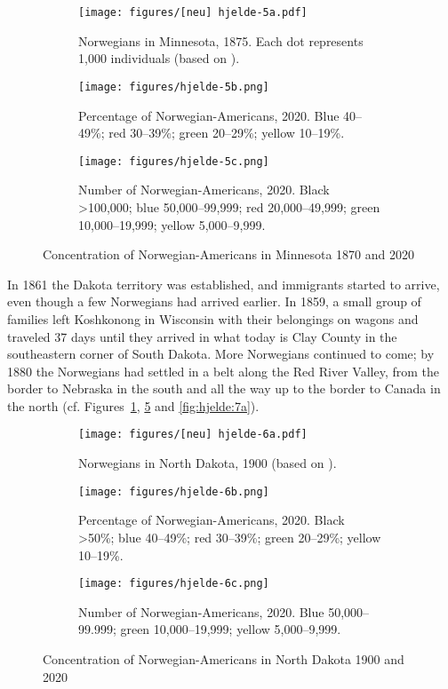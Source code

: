\documentclass[output=paper]{langscibook}
\begin{document}
\begin{figure}
\begin{subfigure}[t]{.3\textwidth}
\texttt{[image: figures/[neu] hjelde-5a.pdf]} 
\caption{Norwegians in Minnesota, 1875. Each dot represents 1,000 individuals (based on \citealt{Qualey1938}).} \label{fig:hjelde:5a}
\end{subfigure}\hfill
\begin{subfigure}[t]{.3\textwidth}
\texttt{[image: figures/hjelde-5b.png]} 
\caption{Percentage of Norwegian\hyp Americans, 2020. Blue 40--49\%; red 30--39\%; green 20--29\%; yellow 10--19\%.}\label{fig:hjelde:5b}
\end{subfigure}\hfill
\begin{subfigure}[t]{.3\textwidth}
\texttt{[image: figures/hjelde-5c.png]} 
\caption{Number of Norwegian\hyp Americans, 2020. Black >100,000; blue 50,000--99,999; red 20,000--49,999; green 10,000--19,999; yellow 5,000--9,999.}\label{fig:hjelde:5c}
\end{subfigure}%
\caption{Concentration of Norwegian-Americans in Minnesota 1870 and 2020}
\end{figure}

In 1861 the Dakota territory was established, and immigrants started to arrive, even though a few Norwegians had arrived earlier. In 1859, a small group of families left Koshkonong in Wisconsin with their belongings on wagons and traveled 37 days until they arrived in what today is Clay County in the southeastern corner of South Dakota. More Norwegians continued to come; by 1880 the Norwegians had settled in a belt along the Red River Valley, from the border to Nebraska in the south and all the way up to the border to Canada in the north (cf. Figures~\ref{fig:hjelde:5a}, \ref{fig:hjelde:6a} and \ref{fig:hjelde:7a}). 


\begin{figure}
\begin{subfigure}[t]{.3\textwidth}
\texttt{[image: figures/[neu] hjelde-6a.pdf]} 
\caption{Norwegians in North Dakota, 1900 (based on \citealt{Qualey1938}).}\label{fig:hjelde:6a}
\end{subfigure}\hfill
\begin{subfigure}[t]{.3\textwidth}
\texttt{[image: figures/hjelde-6b.png]} 
\caption{Percentage of Norwegian\hyp Americans, 2020. Black >50\%; blue 40--49\%; red 30--39\%; green 20--29\%; yellow 10--19\%.}\label{fig:hjelde:6b}
\end{subfigure}\hfill
\begin{subfigure}[t]{.3\textwidth}
\texttt{[image: figures/hjelde-6c.png]} 
\caption{Number of Norwegian\hyp Americans, 2020. Blue 50,000--99.999; green 10,000--19,999; yellow 5,000--9,999.}\label{fig:hjelde:6c}
\end{subfigure}%
\caption{Concentration of Norwegian-Americans in North Dakota 1900 and 2020}
\end{figure}
\end{document}
